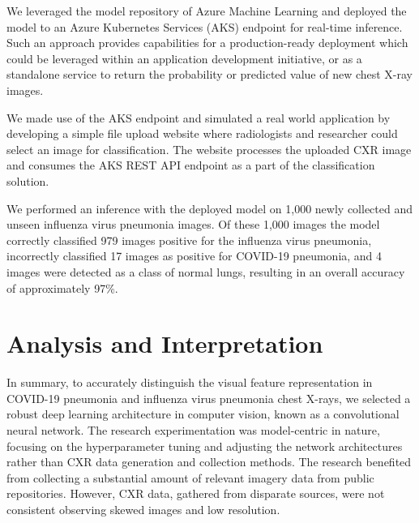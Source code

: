 \documentclass[12pt, twocolumn]{CUP-JNL-PPS}
\begin{document}
\centerline{
}

\vspace{1\baselineskip}

We leveraged the model repository of Azure Machine Learning and
deployed the model to an Azure Kubernetes Services (AKS) endpoint for real-time inference. Such an approach provides capabilities for a production-ready deployment which could be leveraged within an application development initiative, or as a standalone service to return the probability or predicted value of new chest X-ray images.

We made use of the AKS endpoint and simulated a real world application by developing a simple file upload website where radiologists and researcher could select an image for classification. The website processes the uploaded CXR image and consumes the AKS REST API endpoint as a part of the classification solution.

We performed an inference with the deployed model on 1,000 newly
collected and unseen influenza virus pneumonia images. Of these 1,000 images the
model correctly classified 979 images positive for the influenza virus pneumonia,
incorrectly classified 17 images as positive for COVID-19 pneumonia, and 4
images were detected as a class of normal lungs, resulting in an overall accuracy
of approximately 97\%.

\section{Analysis and Interpretation}

In summary, to accurately distinguish the visual feature representation
in COVID-19 pneumonia and influenza virus pneumonia chest X-rays, we selected
a robust deep learning architecture in computer vision, known as a convolutional neural network. The research experimentation was model-centric in nature, focusing on the hyperparameter tuning and adjusting the network architectures rather
than CXR data generation and collection methods. The research benefited from
collecting a substantial amount of relevant imagery data from public repositories. However, CXR data, gathered from disparate sources, were not consistent
observing skewed images and low resolution.
\end{document}
